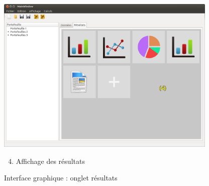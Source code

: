 	\begin{figure}[h]
		\center
		\includegraphics[width=400px]{logicielResultat.png}
		\caption{Interface graphique : onglet résultats}
		\label{interface2}
		\begin{enumerate}
			\setcounter{enumi}{3} 
			\item Affichage des résultats
		\end{enumerate}
	\end{figure}